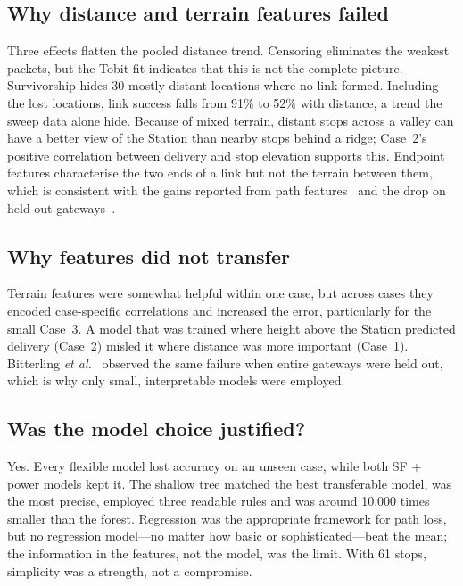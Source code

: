 \documentclass[conference]{IEEEtran}
\begin{document}
\subsection{Why distance and terrain features failed}
Three effects flatten the pooled distance trend. Censoring eliminates the weakest packets, but the Tobit fit indicates that this is not the complete picture. Survivorship hides 30 mostly distant locations where no link formed. Including the lost locations, link success falls from 91\% to 52\% with distance, a trend the sweep data alone hide. Because of mixed terrain, distant stops across a valley can have a better view of the Station than nearby stops behind a ridge; Case~2's positive correlation between delivery and stop elevation supports this. Endpoint features characterise the two ends of a link but not the terrain between them, which is consistent with the gains reported from path features~\cite{ojo2024,ethier2024} and the drop on held-out gateways~\cite{bitterling2026}.

\subsection{Why features did not transfer}
Terrain features were somewhat helpful within one case, but across cases they encoded case-specific correlations and increased the error, particularly for the small Case~3. A model that was trained where height above the Station predicted delivery (Case~2) misled it where distance was more important (Case~1). Bitterling \textit{et al.}~\cite{bitterling2026} observed the same failure when entire gateways were held out, which is why only small, interpretable models were employed.

\subsection{Was the model choice justified?}
Yes. Every flexible model lost accuracy on an unseen case, while both SF + power models kept it. The shallow tree matched the best transferable model, was the most precise, employed three readable rules and was around 10,000 times smaller than the forest. Regression was the appropriate framework for path loss, but no regression model---no matter how basic or sophisticated---beat the mean; the information in the features, not the model, was the limit. With 61 stops, simplicity was a strength, not a compromise.
\end{document}
